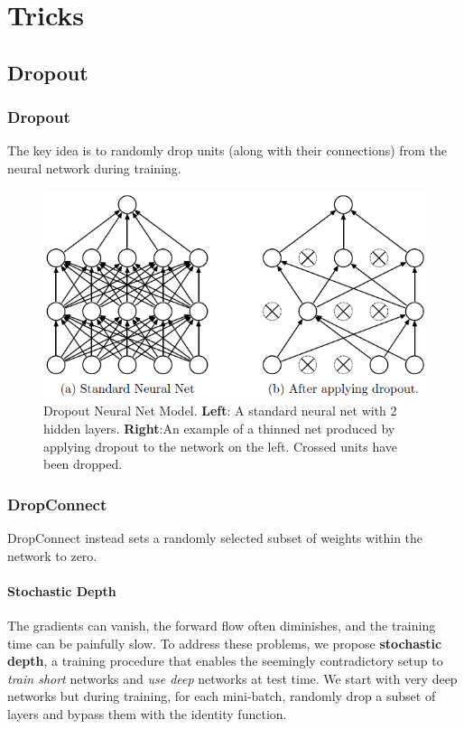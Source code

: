 \chapter{Tricks}
\section{Dropout}
\subsection{Dropout}
The key idea is to randomly drop units (along with their connections) from the neural
network during training\cite{DropOut2012,Srivastava2014}.
\begin{figure}[H]
    \centering
    \includegraphics[width=12cm]{images/dropout.png}
    \caption{Dropout Neural Net Model. 
    \textbf{Left}: A standard neural net with 2 hidden layers. 
    \textbf{Right}:An example of a thinned net produced by applying dropout to the network on the left. Crossed units have been dropped.}
    \label{fig:dropout}
\end{figure}

\subsection{DropConnect}
DropConnect\cite{Wan2013} instead sets a randomly selected subset of weights within the network to zero.

\subsubsection{Stochastic Depth}
The gradients can vanish, the forward flow often diminishes, and the training time can be painfully slow. 
To address these problems, we propose \textbf{stochastic depth}, a training procedure that enables
the seemingly contradictory setup to \textit{train short} networks and \textit{use deep} networks at test time. 
We start with very deep networks but during training, for each mini-batch, randomly drop a subset of layers and bypass
them with the identity function.

